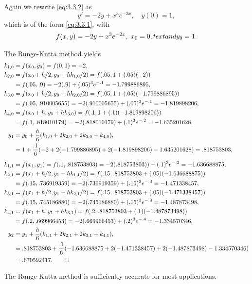 \begin{solution}
Again we rewrite \eqref{eq:3.3.2}  as
\[
y'=-2y+x^3e^{-2x},\quad y(0)=1,
\]
which is of the form \eqref{eq:3.3.1}, with
\[
f(x,y)=-2y+x^3e^{-2x},\ x_0=0,\\text{ and } y_0=1.
\]

{\allowdisplaybreaks
The Runge-Kutta method yields
\begin{align*}
k_{1,0} &= f(x_0,y_0) = f(0,1)=-2,\\
k_{2,0} &= f(x_0+h/2,y_0+hk_{1,0}/2)=f(.05,1+(.05)(-2))\\
 &= f(.05,.9)=-2(.9)+(.05)^3e^{-.1}=-1.799886895,\\
k_{3,0} &= f(x_0+h/2,y_0+hk_{2,0}/2)=f(.05,1+(.05)(-1.799886895))\\
 &= f(.05,.910005655)=-2(.910005655)+(.05)^3e^{-.1}=-1.819898206,\\
k_{4,0} &= f(x_0+h,y_0+hk_{3,0})=f(.1,1+(.1)(-1.819898206))\\
&=f(.1,.818010179)=-2(.818010179)+(.1)^3e^{-.2}=-1.635201628,\\
y_1&=y_0+\frac{h}{6}(k_{1,0}+2k_{2,0}+2k_{3,0}+k_{4,0}),\\
&=1+\frac{.1}{6}(-2+2(-1.799886895)+2(-1.819898206)
-1.635201628)=.818753803,\\\addlinespace
k_{1,1} &= f(x_1,y_1) = f(.1,.818753803)=-2(.818753803))+(.1)^3e^{-.2}=-1.636688875,\\
k_{2,1} &= f(x_1+h/2,y_1+hk_{1,1}/2)=f(.15,.818753803+(.05)(-1.636688875))\\
 &= f(.15,.736919359)=-2(.736919359)+(.15)^3e^{-.3}=-1.471338457,\\
k_{3,1} &= f(x_1+h/2,y_1+hk_{2,1}/2)=f(.15,.818753803+(.05)(-1.471338457))\\
 &= f(.15,.745186880)=-2(.745186880)+(.15)^3e^{-.3}=-1.487873498,\\
k_{4,1} &= f(x_1+h,y_1+hk_{3,1})=f(.2,.818753803+(.1)(-1.487873498))\\
&=f(.2,.669966453)=-2(.669966453)+(.2)^3e^{-.4}=-1.334570346,\\
y_2&=y_1+\frac{h}{6}(k_{1,1}+2k_{2,1}+2k_{3,1}+k_{4,1}),\\
&=.818753803+\frac{.1}{6}(-1.636688875+2(-1.471338457)+2(-1.487873498)-1.334570346)
\\&=.670592417.\qedhere
\end{align*}}
\end{solution}

The Runge-Kutta method is sufficiently accurate for most
applications.

